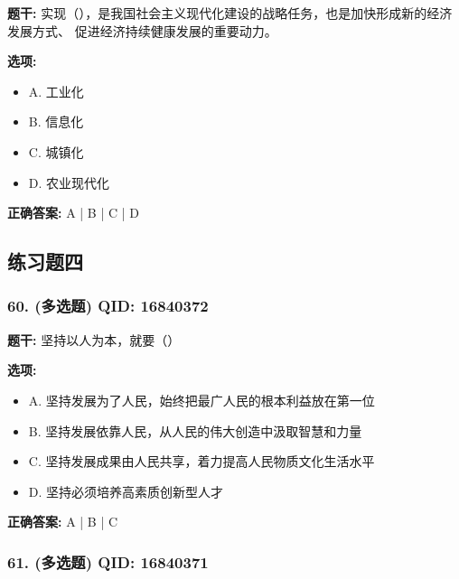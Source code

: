 \documentclass[12pt,UTF8]{ctexart}
\begin{document}
\textbf{题干:}
实现（），是我国社会主义现代化建设的战略任务，也是加快形成新的经济发展方式、 促进经济持续健康发展的重要动力。

\textbf{选项:}
\begin{itemize}[leftmargin=*]

  \item A. 工业化

  \item B. 信息化

  \item C. 城镇化

  \item D. 农业现代化

\end{itemize}

\textbf{正确答案:}
A | B | C | D

\vspace{0.3em}\hrulefill\vspace{0.7em}

\subsection*{练习题四}

\subsubsection*{60. (多选题) \small QID: 16840372}

\textbf{题干:}
坚持以人为本，就要（）

\textbf{选项:}
\begin{itemize}[leftmargin=*]

  \item A. 坚持发展为了人民，始终把最广人民的根本利益放在第一位

  \item B. 坚持发展依靠人民，从人民的伟大创造中汲取智慧和力量

  \item C. 坚持发展成果由人民共享，着力提高人民物质文化生活水平

  \item D. 坚持必须培养高素质创新型人才

\end{itemize}

\textbf{正确答案:}
A | B | C

\vspace{0.3em}\hrulefill\vspace{0.7em}

\subsubsection*{61. (多选题) \small QID: 16840371}
\end{document}
